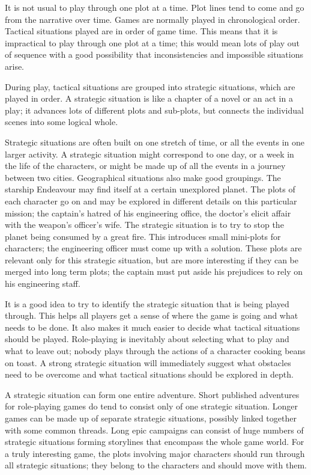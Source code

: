 \documentclass[twoside]{book}
\begin{document}
It is not usual to play through one plot at a time. Plot lines tend to
come and go from the narrative over time. Games are normally played in
chronological order. Tactical situations played are in order of game
time. This means that it is impractical to play through one plot at a
time; this would mean lots of play out of sequence with a good
possibility that inconsistencies and impossible situations arise.

During play, tactical situations are grouped into strategic
situations, which are played in order. A strategic situation is like a
chapter of a novel or an act in a play; it advances lots of different
plots and sub-plots, but connects the individual scenes into some
logical whole.

Strategic situations are often built on one stretch of time, or all
the events in one larger activity. A strategic situation might
correspond to one day, or a week in the life of the characters, or
might be made up of all the events in a journey between two
cities. Geographical situations also make good groupings. The starship
Endeavour may find itself at a certain unexplored planet. The plots of
each character go on and may be explored in different details on this
particular mission; the captain's hatred of his engineering office,
the doctor's elicit affair with the weapon's officer's wife. The
strategic situation is to try to stop the planet being consumed by a
great fire. This introduces small mini-plots for characters; the
engineering officer must come up with a solution. These plots are
relevant only for this strategic situation, but are more interesting
if they can be merged into long term plots; the captain must put aside
his prejudices to rely on his engineering staff.

It is a good idea to try to identify the strategic situation that is
being played through. This helps all players get a sense of where the
game is going and what needs to be done. It also makes it much easier
to decide what tactical situations should be played. Role-playing is
inevitably about selecting what to play and what to leave out; nobody
plays through the actions of a character cooking beans on toast.  A
strong strategic situation will immediately suggest what obstacles
need to be overcome and what tactical situations should be explored in
depth.

A strategic situation can form one entire adventure. Short published
adventures for role-playing games do tend to consist only of one
strategic situation. Longer games can be made up of separate strategic
situations, possibly linked together with some common threads. Long
epic campaigns can consist of huge numbers of strategic situations
forming storylines that encompass the whole game world. For a truly
interesting game, the plots involving major characters should run
through all strategic situations; they belong to the characters and
should move with them.
\end{document}
